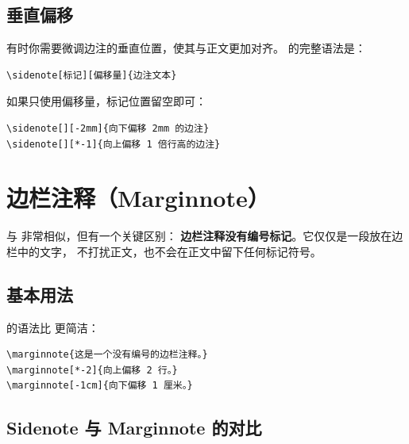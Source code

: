 \subsection{垂直偏移}

有时你需要微调边注的垂直位置，使其与正文更加对齐。
 的完整语法是：

\begin{lstlisting}[style=kaolstplain, caption=完整的边注语法]
\sidenote[标记][偏移量]{边注文本}
\end{lstlisting}


如果只使用偏移量，标记位置留空即可：

\begin{lstlisting}[style=kaolstplain]
\sidenote[][-2mm]{向下偏移 2mm 的边注}
\sidenote[][*-1]{向上偏移 1 倍行高的边注}
\end{lstlisting}

\section{边栏注释（Marginnote）}

 与  非常相似，但有一个关键区别：
\textbf{边栏注释没有编号标记}。它仅仅是一段放在边栏中的文字，
不打扰正文，也不会在正文中留下任何标记符号。


\subsection{基本用法}

 的语法比  更简洁：

\begin{lstlisting}[style=kaolstplain, caption=边栏注释语法]
\marginnote{这是一个没有编号的边栏注释。}
\marginnote[*-2]{向上偏移 2 行。}
\marginnote[-1cm]{向下偏移 1 厘米。}
\end{lstlisting}


\subsection{Sidenote 与 Marginnote 的对比}

